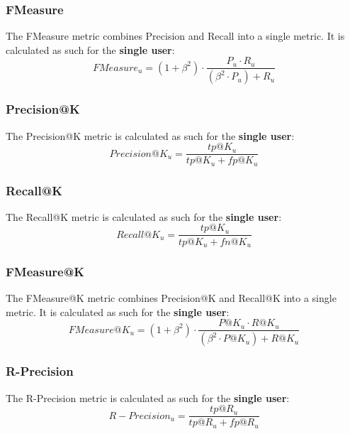 \documentclass[11pt]{article}
\begin{document}

\subsubsection{FMeasure}\label{subsubsec:f-meas}
The FMeasure metric combines Precision and Recall into a single metric.
It is calculated as such for the \textbf{single user}:
\hfill\break
\hfill\break
    \[
        FMeasure_u = (1 + \beta^2) \cdot \frac{P_u \cdot R_u}{(\beta^2 \cdot P_u) + R_u}
    \]


\subsubsection{Precision@K}\label{subsubsec:prec-k}
The Precision@K metric is calculated as such for the \textbf{single user}:
\hfill\break
\hfill\break
    \[
        Precision@K_u = \frac{tp@K_u}{tp@K_u + fp@K_u}
    \]


\subsubsection{Recall@K}\label{subsubsec:rec-k}
The Recall@K metric is calculated as such for the \textbf{single user}:
\hfill\break
\hfill\break
    \[
        Recall@K_u = \frac{tp@K_u}{tp@K_u + fn@K_u}
    \]


\subsubsection{FMeasure@K}\label{subsubsec:f-meas-k}
The FMeasure@K metric combines Precision@K and Recall@K into a single metric.
It is calculated as such for the \textbf{single user}:
\hfill\break
\hfill\break
    \[
        FMeasure@K_u = (1 + \beta^2) \cdot \frac{P@K_u \cdot R@K_u}{(\beta^2 \cdot P@K_u) + R@K_u}
    \]


\subsubsection{R-Precision}\label{subsubsec:r-prec}
The R-Precision metric is calculated as such for the \textbf{single user}:
\hfill\break
\hfill\break
    \[
        R-Precision_u = \frac{tp@R_u}{tp@R_u + fp@R_u}
    \]
\end{document}

